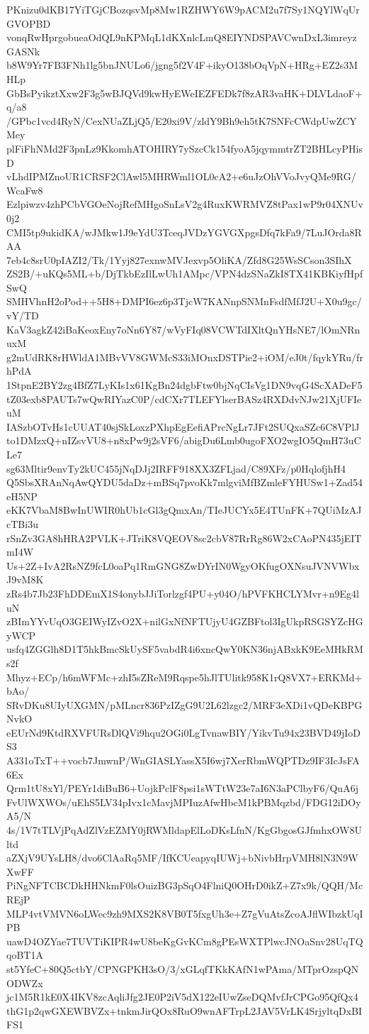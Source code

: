 PKnizu0dKB17YiTGjCBozqsvMp8Mw1RZHWY6W9pACM2u7f7Sy1NQYlWqUrGVOPBD
vonqRwHprgobueaOdQL9nKPMqL1dKXnlcLmQ8EIYNDSPAVCwnDxL3imreyzGASNk
b8W9Yr7FB3FNh1lg5bnJNULo6/jgng5f2V4F+ikyO138bOqVpN+HRg+EZ2s3MHLp
GbBsPyikztXxw2F3g5wBJQVd9kwHyEWeIEZFEDk7f8zAR3vaHK+DLVLdaoF+q/a8
/GPbc1vcd4RyN/CexNUaZLjQ5/E20xi9V/zldY9Bh9eh5tK7SNFcCWdpUwZCYMey
plFiFhNMd2F3pnLz9KkomhATOHIRY7ySzcCk154fyoA5jqymmtrZT2BHLcyPHisD
vLhdIPMZnoUR1CRSF2ClAwl5MHRWml1OL0cA2+e6uJzOhVVoJvyQMe9RG/WcaFw8
Ezlpiwzv4zhPCbVGOeNojRefMHgoSnLsV2g4RuxKWRMVZ8tPax1wP9r04XNUv0j2
CMI5tp9ukidKA/wJMkw1J9eYdU3TceqJVDzYGVGXpgsDfq7kFa9/7LuJOrda8RAA
7eb4c8srU0pIAZI2/Tk/1Yyj827exnwMVJexvp5OliKA/Zfd8G25WsSCson3SIhX
ZS2B/+uKQs5ML+b/DjTkbEzIlLwUh1AMpc/VPN4dzSNaZkI8TX41KBKiyfHpfSwQ
SMHVhnH2oPod++5H8+DMPI6ez6p3TjcW7KANnpSNMnFsdfMfJ2U+X0u9gc/vY/TD
KaV3agkZ42iBaKeoxEny7oNn6Y87/wVyFIq08VCWTdIXltQnYHsNE7/lOmNRnuxM
g2mUdRK8rHWldA1MBvVV8GWMcS33iMOnxDSTPie2+iOM/eJ0t/fqykYRu/frhPdA
1StpnE2BY2zg4BfZ7LyKIs1x61KgBn24dgbFtw0bjNqCIsVg1DN9vqG4ScXADeF5
tZ03exb8PAUTs7wQwRIYazC0P/cdCXr7TLEFYlserBASz4RXDdvNJw21XjUFIeuM
IASzbOTvHs1cUUAT40sjSkLoxzPXhpEgEefiAPrcNgLr7JFt2SUQxaSZc6C8VPlJ
to1DMzxQ+nIZsvVU8+n8xPw9j2sVF6/abigDu6Lmb0ugoFXO2wgIO5QmH73uCLe7
sg63Mltir9envTy2kUC455jNqDJj2IRFF918XX3ZFLjad/C89XFz/p0HqlofjhH4
Q5SbsXRAnNqAwQYDU5daDz+mBSq7pvoKk7mlgviMfBZmleFYHUSw1+Zad54eH5NP
eKK7VbaM8BwInUWIR0hUb1cGl3gQmxAn/TIeJUCYx5E4TUnFK+7QUiMzAJcTBi3u
rSnZv3GA8hHRA2PVLK+JTriK8VQEOV8sc2cbV87RrRg86W2xCAoPN435jEITmI4W
Us+2Z+IvA2RsNZ9fcL0oaPq1RmGNG8ZwDYrIN0WgyOKfugOXNsuJVNVWbxJ9vM8K
zRs4b7Jb23FhDDEmX1S4onybJJiTorlzgf4PU+y04O/hPVFKHCLYMvr+n9Eg4luN
zBImYYvUqO3GEIWyIZvO2X+nilGxNfNFTUjyU4GZBFtol3IgUkpRSGSYZcHGyWCP
usfq4ZGGlh8D1T5hkBmcSkUySF5vabdR4i6xncQwY0KN36njABxkK9EeMHkRMs2f
Mhyz+ECp/h6mWFMc+zhI5sZReM9Rqspe5hJlTUlitk958K1rQ8VX7+ERKMd+bAo/
SRvDKu8UIyUXGMN/pMLncr836PzIZgG9U2L62lzgc2/MRF3eXDi1vQDeKBPGNvkO
eEUrNd9KtdRXVFURsDlQVi9hqu2OGi0LgTvnawBIY/YikvTu94x23BVD49jIoDS3
A331oTxT++vocb7JmwnP/WnGIASLYassX5I6wj7XerRbmWQPTDz9IF3IcJsFA6Ex
Qrm1tU8xYl/PEYr1diBuB6+UojkPclF8psi1sWTtW23e7aI6N3aPClbyF6/QuA6j
FvUlWXWOs/uEhS5LV34pIvx1cMavjMPIuzAfwHbcM1kPBMqzbd/FDG12iDOyA5/N
4s/1V7tTLVjPqAdZlVzEZMY0jRWMldapElLoDKsLfnN/KgGbgosGJfmhxOW8Ultd
aZXjV9UYsLH8/dvo6ClAaRq5MF/IfKCUeapyqIUWj+bNivbHrpVMH8lN3N9WXwFF
PiNgNFTCBCDkHHNkmF0lsOuizBG3pSqO4FlniQ0OHrD0ikZ+Z7x9k/QQH/McREjP
MLP4vtVMVN6oLWec9zh9MXS2K8VB0T5fxgUh3e+Z7gVuAtsZcoAJflWIbzkUqIPB
uawD4OZYae7TUVTiKIPR4wU8beKgGvKCm8gPEsWXTPlwcJNOaSnv28UqTQqoBT1A
st5YfeC+80Q5ctbY/CPNGPKH3sO/3/xGLqfTKkKAfN1wPAma/MTprOzspQNODWZx
jc1M5R1kE0X4IKV8zcAqliJfg2JE0P2iV5dX122eIUwZseDQMvfJrCPGo95QfQx4
thG1p2qwGXEWBVZx+tnkmJirQOx8RuO9wnAFTrpL2JAV5VrLK4SrjyltqDxBIFS1
